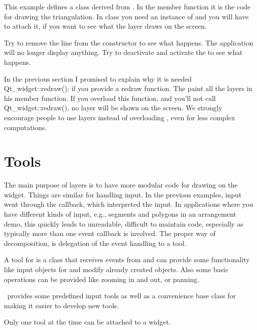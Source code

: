 This example defines a class derived from . In the member
function  it is the code for drawing the triangulation. In 
 class you need an instance of  and you will 
have to attach it, if you want to see what the layer draws on the
screen.

Try to remove the line  from the constructor to
see what happens. The application will no longer display anything. Try
to deactivate and activate the  to see what happens.

\begin{ccAdvanced}
In the previous section I promised to explain why it is needed
Qt\_widget::redraw(); if you provide a redraw function. The
 paint all the layers in his  member
function. If you overload this function, and you'll not call
Qt\_widget::redraw(), no layer will be shown on the screen. We
strongly encourage people to use layers instead of overloading
, even for less complex computations.
\end{ccAdvanced}


\section{Tools}
\label{Qt_widget_tools}

The main purpose of layers is to have more modular code for drawing on
the widget. Things are similar for handling input. In the previous
examples, input went through the 
callback, which interpreted the input. In applications where you have
different kinds of input, e.g., segments and polygons in an
arrangement demo, this quickly leads to unreadable, difficult to maintain
code,  especially as typically more than one event callback is
involved. The proper way of decomposition, is delegation
of the event handling to a tool. 


A tool for  is a class that receives events from
 and can provide some functionality like input
objects for  and modify already created
objects. Also some basic operations can be provided like zooming in
and out, or panning.

\cgal\ provides some predefined input tools as well as a convenience base class 
 for making it easier to develop new tools.

Only one tool at the time can be attached to a widget.

